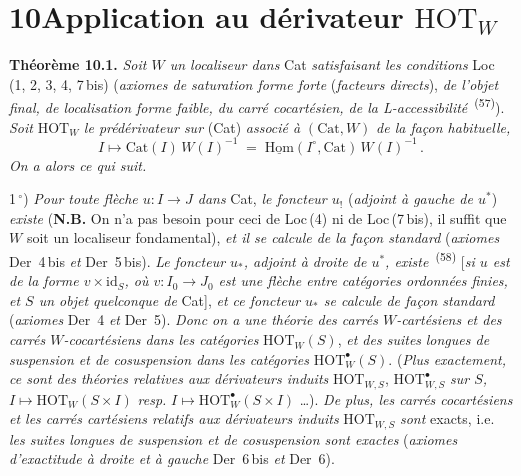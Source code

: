 \documentclass[11pt]{article}
\newcommand{\printedpage}[1]{\marginpar{\footnotesize p.~#1}}
\newcommand{\msp}[1]{\marginpar{\footnotesize [#1]}}
\newcommand{\HOT}{\mathrm{HOT}}
\begin{document}
\printedpage{74}

\msp{page 134}

\section*{10\quad Application au dérivateur $\HOT_W$}

\textbf{Théorème 10.1.} \textit{Soit $W$ un localiseur dans} Cat \textit{satisfaisant les conditions} Loc\,(1, 2, 3, 4, 7\,bis) (\textit{axiomes de saturation forme forte} (\textit{facteurs directs}), \textit{de l'objet final, de localisation forme faible, du carré cocartésien, de la L-accessibilité}~\textsuperscript{(57)}). \textit{Soit} $\HOT_W$ \textit{le prédérivateur sur} (Cat) \textit{associé à} $(\mathrm{Cat}, W)$ \textit{de la façon habituelle,}
\[
I \longmapsto \mathrm{Cat}(I)\,W(I)^{-1} \;=\; \underline{\mathrm{Hom}}(I^{\circ}, \mathrm{Cat})\,W(I)^{-1}\,. \tag*{(10.1.1)}
\]
\textit{On a alors ce qui suit.}

1\,$^{\circ}$) \textit{Pour toute flèche $u : I \longrightarrow J$ dans} Cat, \textit{le foncteur $u_!$} (\textit{adjoint à gauche de $u^*$}) \textit{existe} (\textbf{N.B.} On n'a pas besoin pour ceci de Loc\,(4) ni de Loc\,(7\,bis), il suffit que $W$ soit un localiseur fondamental), \textit{et il se calcule de la façon standard} (\textit{axiomes} Der~4\,bis \textit{et} Der~5\,bis). \textit{Le foncteur $u_*$, adjoint à droite de $u^*$, existe}~\textsuperscript{(58)} [\textit{si $u$ est de la forme $v \times \mathrm{id}_S$, où $v : I_0 \longrightarrow J_0$ est une flèche entre catégories ordonnées finies, et $S$ un objet quelconque de} Cat], \textit{et ce foncteur $u_*$ se calcule de façon standard} (\textit{axiomes} Der~4 \textit{et} Der~5). \textit{Donc on a une théorie des carrés $W$-cartésiens et des carrés $W$-cocartésiens dans les catégories} $\HOT_W(S)$, \textit{et des suites}
\msp{page 135}
\textit{longues de suspension et de cosuspension dans les catégories} $\HOT^{\bullet}_W(S)$. (\textit{Plus exactement, ce sont des théories relatives aux dérivateurs induits} $\HOT_{W,S}$, $\HOT^{\bullet}_{W,S}$ \textit{sur $S$,} $I \longmapsto \HOT_W(S \times I)$ \textit{resp.} $I \longmapsto \HOT^{\bullet}_W(S \times I)$ \ldots). \textit{De plus, les carrés cocartésiens et les carrés cartésiens relatifs aux dérivateurs induits} $\HOT_{W,S}$ \textit{sont} exacts, i.e. \textit{les suites longues de suspension et de cosuspension sont exactes} (\textit{axiomes d'exactitude à droite et à gauche} Der~6\,bis \textit{et} Der~6).
\end{document}
